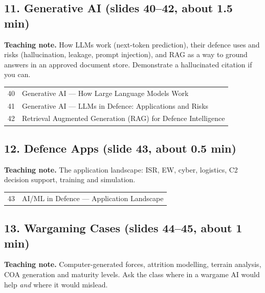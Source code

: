 \documentclass[11pt]{article}
\begin{document}
\subsection{11. Generative AI \normalfont\small\color{GreyN}(slides 40--42, about 1.5 min)}

\textbf{Teaching note.} How LLMs work (next-token prediction), their defence uses and risks (hallucination, leakage, prompt injection), and RAG as a way to ground answers in an approved document store. Demonstrate a hallucinated citation if you can.

\begin{center}\small\renewcommand{\arraystretch}{1.1}\begin{tabularx}{\textwidth}{@{}r X@{}}40 & Generative AI --- How Large Language Models Work\\
41 & Generative AI --- LLMs in Defence: Applications and Risks\\
42 & Retrieval Augmented Generation (RAG) for Defence Intelligence\\\end{tabularx}\end{center}

\subsection{12. Defence Apps \normalfont\small\color{GreyN}(slide 43, about 0.5 min)}

\textbf{Teaching note.} The application landscape: ISR, EW, cyber, logistics, C2 decision support, training and simulation.

\begin{center}\small\renewcommand{\arraystretch}{1.1}\begin{tabularx}{\textwidth}{@{}r X@{}}43 & AI/ML in Defence --- Application Landscape\\\end{tabularx}\end{center}

\subsection{13. Wargaming Cases \normalfont\small\color{GreyN}(slides 44--45, about 1 min)}

\textbf{Teaching note.} Computer-generated forces, attrition modelling, terrain analysis, COA generation and maturity levels. Ask the class where in a wargame AI would help \emph{and} where it would mislead.
\end{document}
